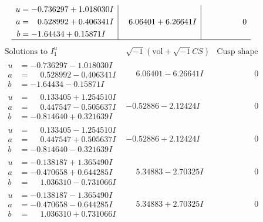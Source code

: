 \documentclass[1p]{elsarticle_modified}
\theoremstyle{definition}
\newcommand{\I}{\sqrt{-1}}
\begin{document}
$$\begin{array}{c|c|c}
\begin{aligned}
u &= -0.736297 + 1.018030 I \\
a &= \phantom{-}0.528992 + 0.406341 I \\
b &= -1.64434 + 0.15871 I\end{aligned}
 & \phantom{-}6.06401 + 6.26641 I & \phantom{-0.000000 } 0\\
 \hline 
 \end{array}$$\newpage$$\begin{array}{c|c|c}  
\text{Solutions to }I^u_{1}& \I (\text{vol} + \sqrt{-1}CS) & \text{Cusp shape}\\
 \hline 
\begin{aligned}
u &= -0.736297 - 1.018030 I \\
a &= \phantom{-}0.528992 - 0.406341 I \\
b &= -1.64434 - 0.15871 I\end{aligned}
 & \phantom{-}6.06401 - 6.26641 I & \phantom{-0.000000 } 0 \\ \hline\begin{aligned}
u &= \phantom{-}0.133405 + 1.254510 I \\
a &= \phantom{-}0.447547 - 0.505637 I \\
b &= -0.814640 + 0.321639 I\end{aligned}
 & -0.52886 - 2.12424 I & \phantom{-0.000000 } 0 \\ \hline\begin{aligned}
u &= \phantom{-}0.133405 - 1.254510 I \\
a &= \phantom{-}0.447547 + 0.505637 I \\
b &= -0.814640 - 0.321639 I\end{aligned}
 & -0.52886 + 2.12424 I & \phantom{-0.000000 } 0 \\ \hline\begin{aligned}
u &= -0.138187 + 1.365490 I \\
a &= -0.470658 + 0.644285 I \\
b &= \phantom{-}1.036310 - 0.731066 I\end{aligned}
 & \phantom{-}5.34883 - 2.70325 I & \phantom{-0.000000 } 0 \\ \hline\begin{aligned}
u &= -0.138187 - 1.365490 I \\
a &= -0.470658 - 0.644285 I \\
b &= \phantom{-}1.036310 + 0.731066 I\end{aligned}
 & \phantom{-}5.34883 + 2.70325 I & \phantom{-0.000000 } 0 \\ \hline\begin{aligned}

\end{aligned}
\end{array}$$
\end{document}

